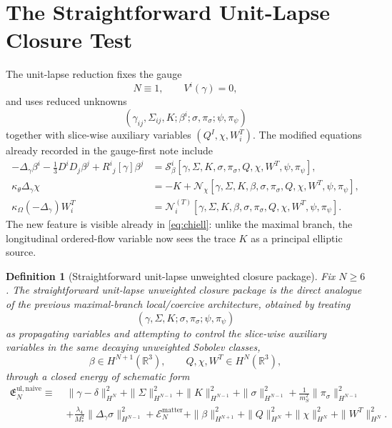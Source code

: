\documentclass[11pt]{article}
\newtheorem{definition}{Definition}
\begin{document}
\section{The Straightforward Unit-Lapse Closure Test}

The unit-lapse reduction fixes the gauge
\begin{equation}
N\equiv 1,
\qquad
V^i(\gamma)=0,
\label{eq:gauge}
\end{equation}
and uses reduced unknowns
\begin{equation}
(\gamma_{ij},\Sigma_{ij},K;\beta^i;\sigma,\pi_\sigma;\psi,\pi_\psi)
\label{eq:unknowns}
\end{equation}
together with slice-wise auxiliary variables \((Q^I,\chi,W_i^T)\). The modified equations already recorded in the gauge-first note include
\begin{align}
-\Delta_\gamma\beta^i-\frac{1}{3}D^iD_j\beta^j + R^i{}_j[\gamma]\beta^j
&=
\mathcal S_\beta^i[\gamma,\Sigma,K,\sigma,\pi_\sigma,Q,\chi,W^T,\psi,\pi_\psi],
\label{eq:betaell}
\\
\kappa_\theta \Delta_\gamma \chi
&=
-K+\mathcal N_\chi[\gamma,\Sigma,K,\beta,\sigma,\pi_\sigma,Q,\chi,W^T,\psi,\pi_\psi],
\label{eq:chiell}
\\
\kappa_\Omega(-\Delta_\gamma)W_i^T
&=
\mathcal N_i^{(T)}[\gamma,\Sigma,K,\beta,\sigma,\pi_\sigma,Q,\chi,W^T,\psi,\pi_\psi].
\label{eq:WTell}
\end{align}
The new feature is visible already in \eqref{eq:chiell}: unlike the maximal branch, the longitudinal ordered-flow variable now sees the trace \(K\) as a principal elliptic source.

\begin{definition}[Straightforward unit-lapse unweighted closure package]
Fix \(N\ge 6\). The \emph{straightforward unit-lapse unweighted closure package} is the direct analogue of the previous maximal-branch local/coercive architecture, obtained by treating
\[
(\gamma,\Sigma,K;\sigma,\pi_\sigma;\psi,\pi_\psi)
\]
as propagating variables and attempting to control the slice-wise auxiliary variables in the same decaying unweighted Sobolev classes,
\begin{equation}
\beta \in H^{N+1}(\mathbb R^3),
\qquad
Q,\chi,W^T \in H^N(\mathbb R^3),
\label{eq:naiveaux}
\end{equation}
through a closed energy of schematic form
\begin{align}
\mathfrak E_N^{\mathrm{ul,naive}}
\equiv\;&
\|\gamma-\delta\|_{H^N}^2
+ \|\Sigma\|_{H^{N-1}}^2
+ \|K\|_{H^{N-1}}^2
+ \|\sigma\|_{H^{N-1}}^2
+ \frac{1}{m_S^2}\|\pi_\sigma\|_{H^{N-1}}^2
\nonumber\\
&+
\frac{\lambda_4}{M_*^2}\|\Delta_\gamma \sigma\|_{H^{N-1}}^2
+ \mathcal E_N^{\mathrm{matter}}
+ \|\beta\|_{H^{N+1}}^2
+ \|Q\|_{H^N}^2
+ \|\chi\|_{H^N}^2
+ \|W^T\|_{H^N}^2.
\label{eq:naiveenergy}
\end{align}
\end{definition}
\end{document}
